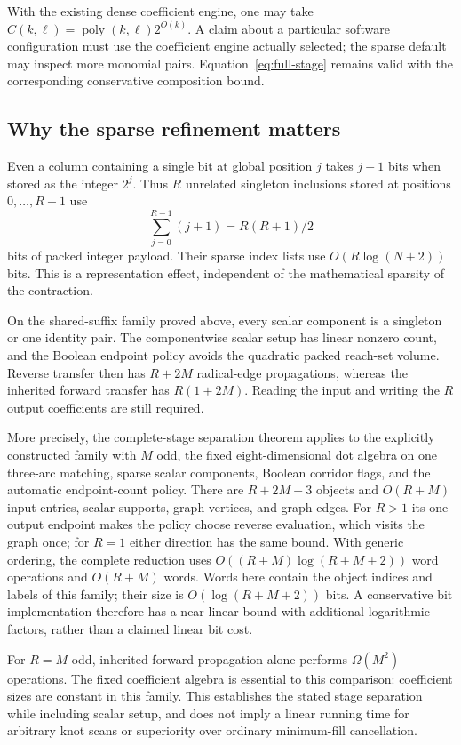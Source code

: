 With the existing dense coefficient engine, one may take
$C(k,\ell)=\operatorname{poly}(k,\ell)2^{O(k)}$. A claim about a
particular software configuration must use the coefficient engine
actually selected; the sparse default may inspect more monomial
pairs. Equation~\eqref{eq:full-stage} remains valid with the
corresponding conservative composition bound.

\subsection{Why the sparse refinement matters}

Even a column containing a single bit at global position $j$ takes
$j+1$ bits when stored as the integer $2^j$. Thus $R$ unrelated
singleton inclusions stored at positions $0,\ldots,R-1$ use
\[
 \sum_{j=0}^{R-1}(j+1)=R(R+1)/2
\]
bits of packed integer payload. Their sparse index lists use
$O(R\log(N+2))$ bits. This is a representation effect, independent
of the mathematical sparsity of the contraction.

On the shared-suffix family proved above, every scalar component is
a singleton or one identity pair. The componentwise scalar setup has
linear nonzero count, and the Boolean endpoint policy avoids the
quadratic packed reach-set volume. Reverse transfer then has
$R+2M$ radical-edge propagations, whereas the inherited forward
transfer has $R(1+2M)$. Reading the input and writing the $R$ output
coefficients are still required.

More precisely, the complete-stage separation theorem applies to
the explicitly constructed family with $M$ odd, the fixed
eight-dimensional dot algebra on one three-arc matching, sparse
scalar components, Boolean corridor flags, and the automatic
endpoint-count policy. There are $R+2M+3$ objects and $O(R+M)$
input entries, scalar supports, graph vertices, and graph edges.
For $R>1$ its one output endpoint makes the policy choose reverse
evaluation, which visits the graph once; for $R=1$ either direction
has the same bound. With generic ordering, the complete reduction uses
$O((R+M)\log(R+M+2))$ word operations and $O(R+M)$ words.
Words here contain the object indices and labels of this family;
their size is $O(\log(R+M+2))$ bits. A conservative bit implementation
therefore has a near-linear bound with additional logarithmic
factors, rather than a claimed linear bit cost.

For $R=M$ odd, inherited forward propagation alone performs
$\Omega(M^2)$ operations. The fixed coefficient algebra is essential
to this comparison: coefficient sizes are constant in this family.
This establishes the stated stage separation while including
scalar setup, and does not imply a linear running time for arbitrary
knot scans or superiority over ordinary minimum-fill cancellation.

